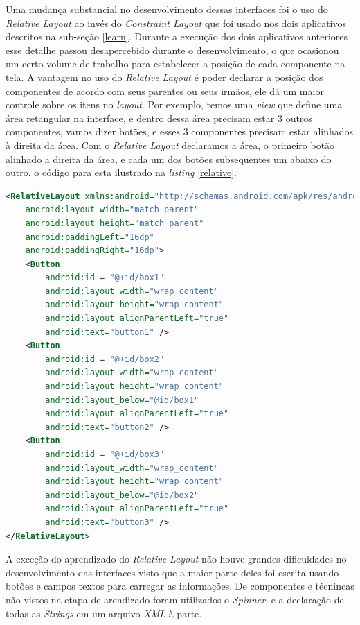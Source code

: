 \documentclass[hidelinks,12pt]{article}
\begin{document}
Uma mudan\c{c}a substancial no desenvolvimento dessas interfaces foi o uso do \textit{Relative Layout} ao inv\'es do \textit{Constraint Layout} que foi usado nos dois aplicativos descritos na sub-se\c{c}\~ao \ref{learn}. Durante a execu\c{c}\~ao dos dois aplicativos anteriores esse detalhe passou desapercebido durante o desenvolvimento, o que ocasionou um certo volume de trabalho para estabelecer a posi\c{c}\~ao de cada componente na tela. A vantagem no uso do \textit{Relative Layout} \'e poder declarar a posi\c{c}\~ao dos componentes de acordo com seus parentes ou seus irm\~aos, ele d\'a um maior controle sobre os itens no \textit{layout}. Por exemplo, temos uma \textit{view} que define uma \'area retangular na interface, e dentro dessa \'area precisam estar 3 outros componentes, vamos dizer bot\~oes, e esses 3 componentes precisam estar alinhados à direita da \'area. Com o \textit{Relative Layout} declaramos a \'area, o primeiro bot\~ao alinhado a direita da \'area, e cada um dos bot\~oes subsequentes um abaixo do outro, o c\'odigo para esta ilustrado na \textit{listing} \ref{relative}.
\begin{lstlisting}[language=XML, caption=\textit{Exemplo de uso de um \textit{RelativeLayout}}, captionpos=b, breaklines=true, label=relative]
<RelativeLayout xmlns:android="http://schemas.android.com/apk/res/android"
	android:layout_width="match_parent"
	android:layout_height="match_parent"
	android:paddingLeft="16dp"
	android:paddingRight="16dp">
	<Button
		android:id = "@+id/box1"
		android:layout_width="wrap_content"
		android:layout_height="wrap_content"
		android:layout_alignParentLeft="true"
		android:text="button1" />
	<Button
		android:id = "@+id/box2"
		android:layout_width="wrap_content"
		android:layout_height="wrap_content"
		android:layout_below="@id/box1"
		android:layout_alignParentLeft="true"
		android:text="button2" />
	<Button
		android:id = "@+id/box3"
		android:layout_width="wrap_content"
		android:layout_height="wrap_content"
		android:layout_below="@id/box2"
		android:layout_alignParentLeft="true"
		android:text="button3" />
</RelativeLayout>
\end{lstlisting}
A exce\c{c}\~ao do aprendizado do \textit{Relative Layout} n\~ao houve grandes dificuldades no desenvolvimento das interfaces visto que a maior parte deles foi escrita usando bot\~oes e campos textos para carregar as informa\c{c}\~oes. De componentes e t\'ecnincas n\~ao vistos na etapa de arendizado foram utilizados o \textit{Spinner}, e a declara\c{c}\~ao de todas as \textit{Strings} em um arquivo \textit{XML} \`a parte.
\end{document}
